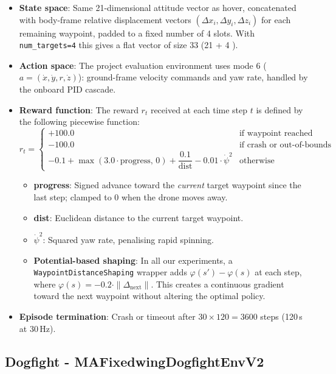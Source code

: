 \documentclass[11pt,a4paper]{article}
\begin{document}
\begin{itemize}
  \item \textbf{State space}: Same 21-dimensional attitude vector as hover, concatenated with body-frame relative displacement vectors $(\Delta x_i, \Delta y_i, \Delta z_i)$ for each remaining waypoint, padded to a fixed number of 4 slots. With \texttt{num\_targets=4} this gives a flat vector of size 33 (21 + 4 ).
  \item \textbf{Action space}: The project evaluation environment uses mode 6 ($a = (\dot{x}, \dot{y}, r, \dot{z})$): ground-frame velocity commands and yaw rate, handled by the onboard PID cascade.
  \item \textbf{Reward function}: The reward $r_t$ received at each time step $t$ is defined by the following piecewise function:
  \begin{equation}
   r_t =
   \begin{cases}
   +100.0 & \text{if waypoint reached} \\
   -100.0 & \text{if crash or out-of-bounds} \\
   -0.1 + \max(3.0 \cdot \text{progress},\,0) + \dfrac{0.1}{\text{dist}} - 0.01 \cdot \dot{\psi}^2 & \text{otherwise}
  \end{cases}
  \end{equation}
  \begin{itemize}
    \item \textbf{progress}: Signed advance toward the \emph{current} target waypoint since the last step; clamped to $0$ when the drone moves away.
    \item \textbf{dist}: Euclidean distance to the current target waypoint.
    \item $\dot{\psi}^2$: Squared yaw rate, penalising rapid spinning.
    \item \textbf{Potential-based shaping}: In all our experiments, a \texttt{WaypointDistanceShaping} wrapper adds $\varphi(s') - \varphi(s)$ at each step, where $\varphi(s) = -0.2 \cdot \|\Delta_{\text{next}}\|$. This creates a continuous gradient toward the next waypoint without altering the optimal policy.
\end{itemize}
  \item \textbf{Episode termination}: Crash or timeout after $30 \times 120 = 3600$ steps (120\,s at 30\,Hz).

\end{itemize}

\subsection{Dogfight - MAFixedwingDogfightEnvV2}
\end{document}
